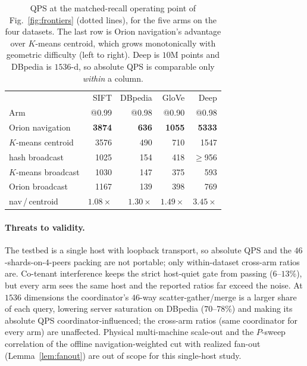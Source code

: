 \begin{table}[t]
\centering
\small
\begin{tabular}{@{}lrrrr@{}}
\toprule
& SIFT & DBpedia & GloVe & Deep \\
Arm & @0.99 & @0.98 & @0.90 & @0.98 \\
\midrule
Orion navigation   & \textbf{3874} & \textbf{636} & \textbf{1055} & \textbf{5333} \\
$K$-means centroid & 3576 & 490 & 710 & 1547 \\
hash broadcast     & 1025 & 154 & 418 & $\ge$956 \\
$K$-means broadcast& 1030 & 147 & 375 & 593 \\
Orion broadcast    & 1167 & 139 & 398 & 769 \\
\midrule
nav\,/\,centroid   & $1.08\times$ & $1.30\times$ & $1.49\times$ & $3.45\times$ \\
\bottomrule
\end{tabular}
\caption{QPS at the matched-recall operating point of Fig.~\ref{fig:frontiers}
(dotted lines), for the five arms on the four datasets. The last row is Orion
navigation's advantage over $K$-means centroid, which grows monotonically with
geometric difficulty (left to right). Deep is $10$M points and DBpedia is
$1536$-d, so absolute QPS is comparable only \emph{within} a column.}
\label{tab:eval-qps}
\end{table}

\paragraph{Threats to validity.}
The testbed is a single host with loopback transport, so absolute QPS and the
$46$-shards-on-$4$-peers packing are not portable; only within-dataset cross-arm
ratios are. Co-tenant interference keeps the strict host-quiet gate from passing
($6\text{--}13\%$), but every arm sees the same host and the reported ratios far
exceed the noise. At $1536$ dimensions the coordinator's $46$-way
scatter-gather/merge is a larger share of each query, lowering server saturation
on DBpedia ($70\text{--}78\%$) and making its absolute QPS coordinator-influenced;
the cross-arm ratios (same coordinator for every arm) are unaffected. Physical
multi-machine scale-out and the $P$-sweep correlation of the offline
navigation-weighted cut with realized fan-out (Lemma~\ref{lem:fanout}) are
out of scope for this single-host study.

% 
